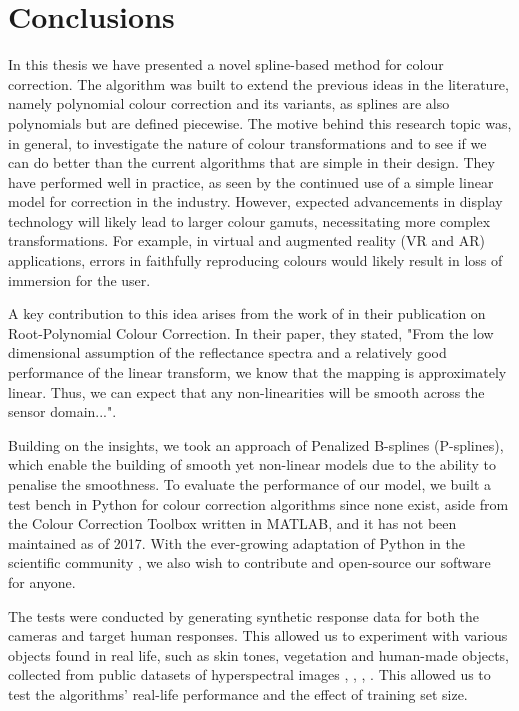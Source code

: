 \chapter{Conclusions}
\label{ch:conclusion}

In this thesis we have presented a novel spline-based method for colour correction. The algorithm was built to extend the previous ideas in the literature, namely polynomial colour correction and its variants, as splines are also polynomials but are defined piecewise. The motive behind this research topic was, in general, to investigate the nature of colour transformations and to see if we can do better than the current algorithms that are simple in their design. They have performed well in practice, as seen by the continued use of a simple linear model for correction in the industry. However, expected advancements in display technology will likely lead to larger colour gamuts, necessitating more complex transformations. For example, in virtual and augmented reality (VR and AR) applications, errors in faithfully reproducing colours would likely result in loss of immersion for the user. 

A key contribution to this idea arises from the work of \citeauthor{finlayson2015color} in their publication on Root-Polynomial Colour Correction. In their paper, they stated, "From the low dimensional assumption of the reflectance spectra and a relatively good performance of the linear transform, we know that the mapping is approximately linear. Thus, we can expect that any non-linearities will be smooth across the sensor domain...". \cite[10]{finlayson2015color} 

Building on the insights, we took an approach of Penalized B-splines (P-splines), which enable the building of smooth yet non-linear models due to the ability to penalise the smoothness. To evaluate the performance of our model, we built a test bench in Python for colour correction algorithms since none exist, aside from the Colour Correction Toolbox \cite{fang2017colour} written in MATLAB, and it has not been maintained as of 2017. With the ever-growing adaptation of Python in the scientific community \cite{ozgur2017matlab}, we also wish to contribute and open-source our software for anyone.

The tests were conducted by generating synthetic response data for both the cameras and target human responses. This allowed us to experiment with various objects found in real life, such as skin tones, vegetation and human-made objects, collected from public datasets of hyperspectral images \cite{foster:2002}, \cite{Foster2022}, \cite{CAVE_0293}, \cite{wueller2009situ}. This allowed us to test the algorithms' real-life performance and the effect of training set size.

